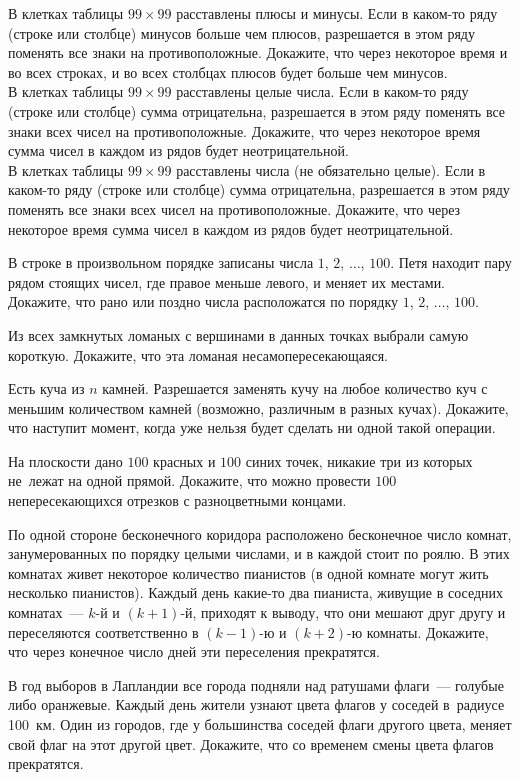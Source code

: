 \begin{problems}
\item
\sbp
В клетках таблицы $99 \times 99$ расставлены плюсы и минусы.
Если в каком-то ряду (строке или столбце) минусов больше чем плюсов,
разрешается в этом ряду поменять все знаки на противоположные.
Докажите, что через некоторое время и во всех строках, и во всех столбцах
плюсов будет больше чем минусов.
\\
\sbp
В клетках таблицы $99 \times 99$ расставлены целые числа.
Если в каком-то ряду (строке или столбце) сумма отрицательна, разрешается в
этом ряду поменять все знаки всех чисел на противоположные.
Докажите, что через некоторое время сумма чисел в каждом из рядов будет
неотрицательной.
\\
\sbp
В клетках таблицы $99 \times 99$ расставлены числа (не обязательно целые).
Если в каком-то ряду (строке или столбце) сумма отрицательна, разрешается в
этом ряду поменять все знаки всех чисел на противоположные.
Докажите, что через некоторое время сумма чисел в каждом из рядов будет
неотрицательной.

\item
В строке в произвольном порядке записаны числа $1$, $2$, $\ldots$, $100$.
Петя находит пару рядом стоящих чисел, где правое меньше левого, и меняет их
местами.
Докажите, что рано или поздно числа расположатся по порядку
$1$, $2$, $\ldots$, $100$.

\item
Из всех замкнутых ломаных с вершинами в данных точках выбрали самую короткую.
Докажите, что эта ломаная несамопересекающаяся.

\item
Есть куча из $n$ камней.
Разрешается заменять кучу на любое количество куч с меньшим количеством камней
(возможно, различным в разных кучах).
Докажите, что наступит момент, когда уже нельзя будет сделать ни одной такой
операции.

\item
На плоскости дано $100$ красных и $100$ синих точек, никакие три из которых
не~лежат на одной прямой.
Докажите, что можно провести $100$ непересекающихся отрезков с разноцветными
концами.

\item
По одной стороне бесконечного коридора расположено бесконечное число комнат,
занумерованных по порядку целыми числами, и в каждой стоит по роялю.
В этих комнатах живет некоторое количество пианистов
(в одной комнате могут жить несколько пианистов).
Каждый день какие-то два пианиста, живущие в соседних комнатах~--- $k$-й и
$(k + 1)$-й, приходят к выводу, что они мешают друг другу и переселяются
соответственно в $(k - 1)$-ю и $(k + 2)$-ю комнаты.
Докажите, что через конечное число дней эти переселения прекратятся.

\item
В год выборов в Лапландии все города подняли над ратушами флаги~--- голубые
либо оранжевые.
Каждый день жители узнают цвета флагов у соседей в~радиусе 100~км.
Один из городов, где у большинства соседей флаги другого цвета, меняет свой
флаг на этот другой цвет.
Докажите, что со временем смены цвета флагов прекратятся.

\end{problems}

